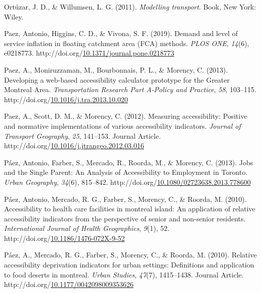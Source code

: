 \documentclass[
11pt, %
oneside, %
english, %
singlespacing, %
]{macthesis} %
\newlength{\cslhangindent}
\newenvironment{CSLReferences}[2] %
{\begin{list}{}{%
	\setlength{\itemindent}{0pt}
	\setlength{\leftmargin}{0pt}
	\setlength{\parsep}{0pt}
	\ifodd #1
	\setlength{\leftmargin}{\cslhangindent}
	\setlength{\itemindent}{-1\cslhangindent}
	\fi
	\setlength{\itemsep}{#2\baselineskip}}}
{\end{list}}
\begin{document}
\begin{CSLReferences}{1}{0}
Ortúzar, J. D., \& Willumsen, L. G. (2011). \emph{Modelling transport}. Book, New York: Wiley.

Paez, Antonio, Higgins, C. D., \& Vivona, S. F. (2019). Demand and level of service inflation in floating catchment area ({FCA}) methods. \emph{{PLOS} {ONE}}, \emph{14}(6), e0218773. http://doi.org/\href{https://doi.org/10.1371/journal.pone.0218773}{10.1371/journal.pone.0218773}

Paez, A., Moniruzzaman, M., Bourbonnais, P. L., \& Morency, C. (2013). Developing a web-based accessibility calculator prototype for the {Greater} {Montreal} {Area}. \emph{Transportation Research Part A-Policy and Practice}, \emph{58}, 103--115. http://doi.org/\href{https://doi.org/10.1016/j.tra.2013.10.020}{10.1016/j.tra.2013.10.020}

Paez, A., Scott, D. M., \& Morency, C. (2012). Measuring accessibility: Positive and normative implementations of various accessibility indicators. \emph{Journal of Transport Geography}, \emph{25}, 141--153. Journal Article. http://doi.org/\href{https://doi.org/10.1016/j.jtrangeo.2012.03.016}{10.1016/j.jtrangeo.2012.03.016}

Páez, Antonio, Farber, S., Mercado, R., Roorda, M., \& Morency, C. (2013). Jobs and the {Single} {Parent}: {An} {Analysis} of {Accessibility} to {Employment} in {Toronto}. \emph{Urban Geography}, \emph{34}(6), 815--842. http://doi.org/\href{https://doi.org/10.1080/02723638.2013.778600}{10.1080/02723638.2013.778600}

Páez, Antonio, Mercado, R. G., Farber, S., Morency, C., \& Roorda, M. (2010). Accessibility to health care facilities in montreal island: An application of relative accessibility indicators from the perspective of senior and non-senior residents. \emph{International Journal of Health Geographics}, \emph{9}(1), 52. http://doi.org/\href{https://doi.org/10.1186/1476-072X-9-52}{10.1186/1476-072X-9-52}

Páez, A., Mercado, R. G., Farber, S., Morency, C., \& Roorda, M. (2010). Relative accessibility deprivation indicators for urban settings: Definitions and application to food deserts in montreal. \emph{Urban Studies}, \emph{47}(7), 1415--1438. Journal Article. http://doi.org/\href{https://doi.org/10.1177/0042098009353626}{10.1177/0042098009353626}


\end{CSLReferences}
\end{document}
